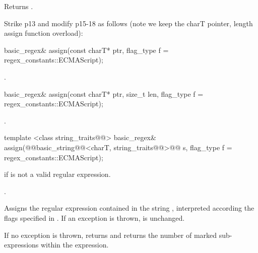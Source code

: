 \documentclass[ebook,11pt,article]{memoir}
\begin{document}
\begin{itemdescr}
\pnum
\effects Returns .
\end{itemdescr}

Strike p13 and modify p15-18 as follows (note we keep the charT pointer, length assign function overload):
\begin{removedblock}
\begin{itemdecl}
basic_regex& assign(const charT* ptr, flag_type f = regex_constants::ECMAScript); 
\end{itemdecl}

\begin{itemdescr}
\pnum
\returns  {}.
\end{itemdescr}
\end{removedblock}
\begin{itemdecl}
basic_regex& assign(const charT* ptr, size_t len,
  flag_type f = regex_constants::ECMAScript);
\end{itemdecl}

\begin{itemdescr}
\pnum
\returns {}.
\end{itemdescr}

\begin{itemdecl}
template <class string_traits@@>
  basic_regex& assign(@@basic_string@@<charT, string_traits@@>@\removed{\&}@ s,
                      flag_type f = regex_constants::ECMAScript); 
\end{itemdecl}

\begin{itemdescr}
\pnum
\throws  {} if  is not a valid regular expression. 

\pnum
\returns  {}.

\pnum
\effects  Assigns the regular expression contained in the string 
, interpreted according the flags specified in . 
If an exception is thrown,  is unchanged.  

\pnum
\postconditions
If no exception is thrown,
 returns  and 
returns the number of marked sub-expressions within the expression.
\end{itemdescr}
\end{document}
